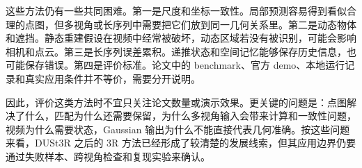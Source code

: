 \documentclass[UTF8,a4paper,zihao=-4,fontset=windows]{ctexart}
\begin{document}
这些方法仍有一些共同困难。第一是尺度和坐标一致性。局部预测容易得到看似合理的点图，但多视角或长序列中需要把它们放到同一几何关系里。第二是动态物体和遮挡。静态重建假设在视频中经常被破坏，动态区域若没有被识别，可能会影响相机和点云。第三是长序列误差累积。递推状态和空间记忆能够保存历史信息，也可能保存错误。第四是评价标准。论文中的 benchmark、官方 demo、本地运行记录和真实应用条件并不等价，需要分开说明。

因此，评价这类方法时不宜只关注论文数量或演示效果。更关键的问题是：点图解决了什么，匹配为什么还需要保留，为什么多视角输入会带来计算和一致性问题，视频为什么需要状态，Gaussian 输出为什么不能直接代表几何准确。按这些问题来看，DUSt3R 之后的 3R 方法已经形成了较清楚的发展线索，但其应用边界仍要通过失败样本、跨视角检查和复现实验来确认。



\end{document}

